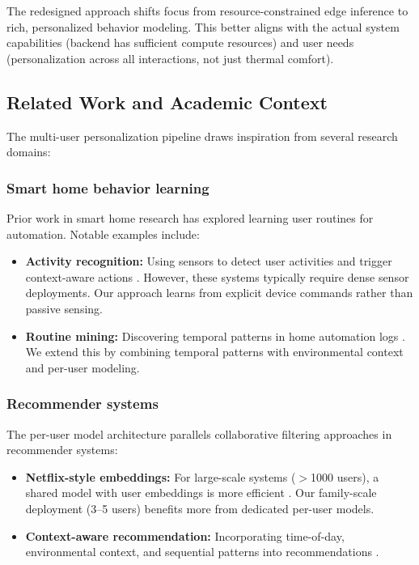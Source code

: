 The redesigned approach shifts focus from resource-constrained edge
inference to rich, personalized behavior modeling. This better aligns with
the actual system capabilities (backend has sufficient compute resources)
and user needs (personalization across all interactions, not just thermal
comfort).

\subsection{Related Work and Academic Context}

The multi-user personalization pipeline draws inspiration from several
research domains:

\subsubsection{Smart home behavior learning}
Prior work in smart home research has explored learning user routines for
automation. Notable examples include:
\begin{itemize}
    \item \textbf{Activity recognition:} Using sensors to detect user
    activities and trigger context-aware actions \cite{cook_smart_homes_2012}.
    However, these systems typically require dense sensor deployments.
    Our approach learns from explicit device commands rather than passive
    sensing.
    \item \textbf{Routine mining:} Discovering temporal patterns in home
    automation logs \cite{roy_routine_mining_2016}. We extend this by
    combining temporal patterns with environmental context and per-user
    modeling.
\end{itemize}

\subsubsection{Recommender systems}
The per-user model architecture parallels collaborative filtering
approaches in recommender systems:
\begin{itemize}
    \item \textbf{Netflix-style embeddings:} For large-scale systems
    ($>$1000 users), a shared model with user embeddings is more efficient
    \cite{netflix_embeddings_2016}. Our family-scale deployment
    (3--5 users) benefits more from dedicated per-user models.
    \item \textbf{Context-aware recommendation:} Incorporating time-of-day,
    environmental context, and sequential patterns into recommendations
    \cite{context_aware_rec_2015}.
\end{itemize}

